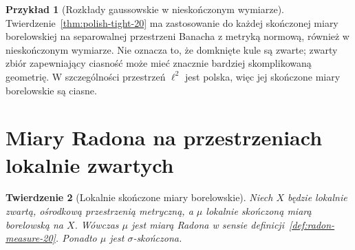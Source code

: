 \documentclass[11pt,a4paper,oneside]{book}
\numberwithin{equation}{chapter}
\theoremstyle{plain}
\newtheorem{twierdzenie}{Twierdzenie}[chapter]
\theoremstyle{definition}
\newtheorem{przyklad}[twierdzenie]{Przykład}
\theoremstyle{remark}
\begin{document}
\begin{przyklad}[Rozkłady gaussowskie w nieskończonym wymiarze]
Twierdzenie~\ref{thm:polish-tight-20} ma zastosowanie
do każdej skończonej miary borelowskiej na separowalnej
przestrzeni Banacha z metryką normową, również w nieskończonym
wymiarze. Nie oznacza to, że domknięte kule są zwarte;
zwarty zbiór zapewniający ciasność może mieć znacznie
bardziej skomplikowaną geometrię. W szczególności
przestrzeń $\ell^2$ jest polska, więc jej skończone
miary borelowskie są ciasne.
\end{przyklad}

\section{Miary Radona na przestrzeniach lokalnie zwartych}
\begin{twierdzenie}[Lokalnie skończone miary borelowskie]
\label{thm:lch-secondcountable-radon-20}
Niech $X$ będzie lokalnie zwartą, ośrodkową
przestrzenią metryczną, a $\mu$ lokalnie skończoną
miarą borelowską na $X$. Wówczas $\mu$ jest miarą
Radona w sensie definicji~\ref{def:radon-measure-20}.
Ponadto $\mu$ jest $\sigma$-skończona.
\end{twierdzenie}
\end{document}
